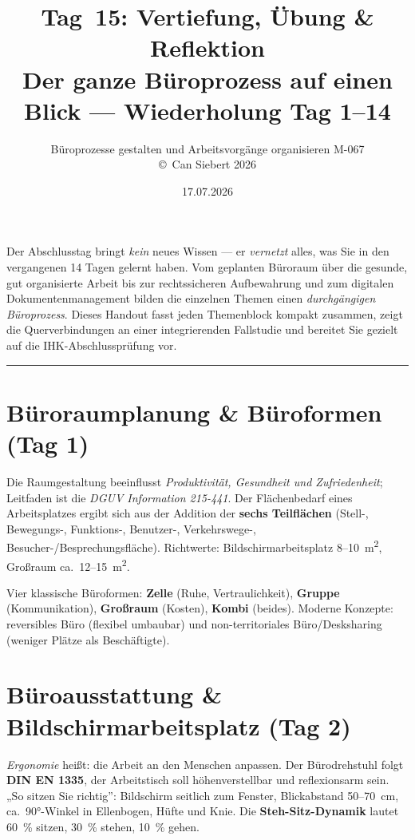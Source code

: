 \documentclass[11pt, a4paper]{article}
\title{\vspace*{-1.5cm}\Huge\bfseries\color{bfwPrimaryDark}Tag~15: Vertiefung, Übung \& Reflektion\\[0.4em]
  \large\color{bfwInkSoft}\textnormal{Der ganze Büroprozess auf einen Blick --- Wiederholung Tag 1--14}}
\author{\textsf{Büroprozesse gestalten und Arbeitsvorgänge organisieren \textperiodcentered{} M-067}\\
\textsf{\small\copyright\ Can Siebert\,\textperiodcentered\,2026}}
\date{17.07.2026}
\begin{document}
\maketitle
\thispagestyle{empty}

\vspace{1em}
\begin{merksatz}[title={\bfseries Worum geht es heute?}]
Der Abschlusstag bringt \emph{kein} neues Wissen --- er \emph{vernetzt} alles, was Sie in
den vergangenen 14 Tagen gelernt haben. Vom geplanten Büroraum über die gesunde,
gut organisierte Arbeit bis zur rechtssicheren Aufbewahrung und zum digitalen
Dokumentenmanagement bilden die einzelnen Themen einen \emph{durchgängigen Büroprozess}.
Dieses Handout fasst jeden Themenblock kompakt zusammen, zeigt die Querverbindungen an
einer integrierenden Fallstudie und bereitet Sie gezielt auf die IHK-Abschlussprüfung vor.
\end{merksatz}

\tableofcontents
\vspace{1em}
\hrule
\vspace{1em}

\section{Büroraumplanung \& Büroformen (Tag 1)}

Die Raumgestaltung beeinflusst \emph{Produktivität, Gesundheit und Zufriedenheit};
Leitfaden ist die \emph{DGUV Information 215-441}. Der Flächenbedarf eines Arbeitsplatzes
ergibt sich aus der Addition der \textbf{sechs Teilflächen} (Stell-, Bewegungs-,
Funktions-, Benutzer-, Verkehrswege-, Besucher-/Besprechungsfläche). Richtwerte:
Bildschirmarbeitsplatz 8--10~m\textsuperscript{2}, Großraum ca.\ 12--15~m\textsuperscript{2}.

\begin{merksatz}
Vier klassische Büroformen: \textbf{Zelle} (Ruhe, Vertraulichkeit), \textbf{Gruppe}
(Kommunikation), \textbf{Großraum} (Kosten), \textbf{Kombi} (beides). Moderne Konzepte:
reversibles Büro (flexibel umbaubar) und non-territoriales Büro/Desksharing (weniger
Plätze als Beschäftigte).
\end{merksatz}

\section{Büroausstattung \& Bildschirmarbeitsplatz (Tag 2)}

\emph{Ergonomie} heißt: die Arbeit an den Menschen anpassen. Der Bürodrehstuhl folgt
\textbf{DIN EN 1335}, der Arbeitstisch soll höhenverstellbar und reflexionsarm sein.
„So sitzen Sie richtig'': Bildschirm seitlich zum Fenster, Blickabstand 50--70~cm,
ca.\ 90°-Winkel in Ellenbogen, Hüfte und Knie. Die
\textbf{Steh-Sitz-Dynamik} lautet 60~\% sitzen, 30~\% stehen, 10~\% gehen.
\end{document}
